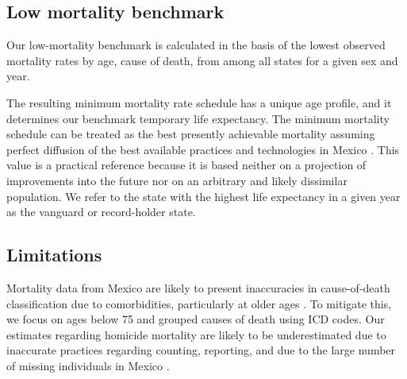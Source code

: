 \documentclass{bmcart}
\begin{document}
\subsection*{Low mortality benchmark}
Our low-mortality benchmark is calculated in the basis of the lowest observed mortality rates by age, cause of death, from among all states for a given sex and year.



The resulting minimum mortality rate schedule has a unique age profile, and it determines our benchmark temporary life expectancy. The minimum mortality schedule can be treated as the best presently achievable mortality assuming perfect diffusion of the best available practices and technologies in Mexico \cite{vallin2008minimum}. This value is a practical reference because it is based neither on a projection of improvements into the future nor on an arbitrary and likely dissimilar population. We refer to the state with the highest life expectancy in a given year as the vanguard or record-holder state.


\subsection*{Limitations}
Mortality data from Mexico are
likely to present inaccuracies in cause-of-death classification due to
comorbidities, particularly at older ages \cite{tobias2001}. To mitigate this,
we focus on ages below 75 and grouped causes of death using ICD codes.
Our estimates regarding homicide mortality are likely to be
underestimated due to inaccurate practices regarding counting, reporting,
and due to the large number of missing individuals in Mexico \cite{HRW2011}.
\end{document}
